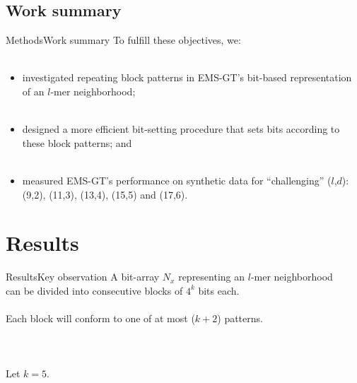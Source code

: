 \documentclass[pdf,xcolor={dvipsnames}]{beamer}
\begin{document}
	\subsection{Work summary}
	\begin{frame}{Methods}{Work summary}
		To fulfill these objectives, we:\\ \ \\
		\begin{itemize}
		\item %
		investigated repeating block patterns in EMS-GT's bit-based representation of an $l$-mer neighborhood;\\ \ \\

		\item designed a more efficient bit-setting procedure that sets bits according to these block patterns; and\\ \ \\
		
		\item measured EMS-GT's performance on synthetic data for ``challenging'' ($l$,$d$): (9,2), (11,3), (13,4), (15,5) and (17,6).
		\end{itemize}
		\end{frame}

\section{Results}
	\begin{frame}{Results}{Key observation}
	\centering
	A bit-array $N_x$ representing an $l$-mer neighborhood\\
	can be divided into consecutive blocks of $4^k$ bits each.\\ \ \\
	Each block will conform to one of at most ($k + 2$) patterns.\\ \ \\ \ \\\
	\\
	Let $k = 5$.

	\end{frame}
\end{document}

